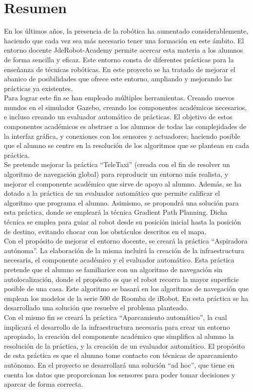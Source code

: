 \chapter*{Resumen}

En los últimos años, la presencia de la robótica ha aumentado considerablemente, haciendo que cada vez sea más necesario tener una formación en este ámbito. El entorno docente JdeRobot-Academy permite acercar esta materia a los alumnos de forma sencilla y eficaz. Este entorno consta de diferentes prácticas para la enseñanza de técnicas robóticas. En este proyecto se ha tratado de mejorar el abanico de posibilidades que ofrece este entorno, ampliando y mejorando las prácticas ya existentes.\\

Para lograr este fin se han empleado múltiples herramientas. Creando nuevos mundos en el simulador Gazebo, creando los componentes académicos necesarios, e incluso creando un evaluador automático de prácticas. El objetivo de estos componentes académicos es abstraer a los alumnos de todas las complejidades de la interfaz gráfica, y conexiones con los sensores y actuadores; haciendo posible que el alumno se centre en la resolución de los algoritmos que se plantean en cada práctica.\\

Se pretende mejorar la práctica ``TeleTaxi'' (creada con el fin de resolver un algoritmo de navegación global) para reproducir un entorno más realista, y mejorar el componente académico que sirve de apoyo al alumno. Además, se ha dotado a la práctica de un evaluador automático que permite calificar el algoritmo que programa el alumno. Asimismo, se propondrá una solución para esta práctica, donde se empleará la técnica Gradient Path Planning. Dicha técnica se emplea para guiar al robot desde su posición inicial hasta la posición de destino, evitando chocar con los obstáculos descritos en el mapa.\\

Con el propósito de mejorar el entorno docente, se creará la práctica ``Aspiradora autónoma''. La elaboración de la misma incluirá la creación de la infraestructura necesaria, el componente académico y el evaluador automático. Esta práctica pretende que el alumno se familiarice con un algoritmo de navegación sin autolocalización, donde el propósito es que el robot recorra la mayor superficie posible de una casa. Este algoritmo se basará en los algoritmos de navegación que emplean los modelos de la serie 500 de Roomba de iRobot. En esta práctica se ha desarrollado una solución que resuelve el problema planteado.\\

Con el mismo fin se creará la práctica ``Aparcamiento automático'', la cual implicará el desarrollo de la infraestructura necesaria para crear un entorno apropiado, la creación del componente académico que simplifica al alumno la resolución de la práctica, y la creación de un evaluador automático. El propósito de esta práctica es que el alumno tome contacto con técnicas de aparcamiento autónomo. En el proyecto se desarrollará una solución “ad hoc”, que tiene en cuenta los datos que proporcionan los sensores para poder tomar decisiones y aparcar de forma correcta.